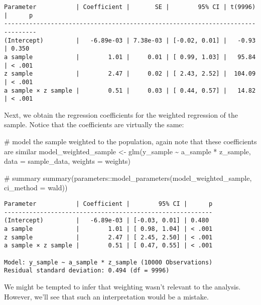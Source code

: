 \documentclass[
  single column]{article}
\newenvironment{Shaded}{\begin{snugshade}}{\end{snugshade}}
\newcommand{\AttributeTok}[1]{\textcolor[rgb]{0.40,0.45,0.13}{#1}}
\newcommand{\CommentTok}[1]{\textcolor[rgb]{0.37,0.37,0.37}{#1}}
\newcommand{\FunctionTok}[1]{\textcolor[rgb]{0.28,0.35,0.67}{#1}}
\newcommand{\NormalTok}[1]{\textcolor[rgb]{0.00,0.23,0.31}{#1}}
\newcommand{\OtherTok}[1]{\textcolor[rgb]{0.00,0.23,0.31}{#1}}
\newcommand{\SpecialCharTok}[1]{\textcolor[rgb]{0.37,0.37,0.37}{#1}}
\newcommand{\StringTok}[1]{\textcolor[rgb]{0.13,0.47,0.30}{#1}}
\begin{document}
\begin{verbatim}
Parameter           | Coefficient |       SE |        95% CI | t(9996) |      p
-------------------------------------------------------------------------------
(Intercept)         |   -6.89e-03 | 7.38e-03 | [-0.02, 0.01] |   -0.93 | 0.350 
a sample            |        1.01 |     0.01 | [ 0.99, 1.03] |   95.84 | < .001
z sample            |        2.47 |     0.02 | [ 2.43, 2.52] |  104.09 | < .001
a sample × z sample |        0.51 |     0.03 | [ 0.44, 0.57] |   14.82 | < .001
\end{verbatim}

Next, we obtain the regression coefficients for the weighted regression
of the sample. Notice that the coefficients are virtually the same:

\begin{Shaded}
\begin{Highlighting}[]
\CommentTok{\# model the sample weighted to the population, again note that these coefficients are similar }
\NormalTok{model\_weighted\_sample }\OtherTok{\textless{}{-}} \FunctionTok{glm}\NormalTok{(y\_sample }\SpecialCharTok{\textasciitilde{}}\NormalTok{ a\_sample }\SpecialCharTok{*}\NormalTok{ z\_sample, }
  \AttributeTok{data =}\NormalTok{ sample\_data, }\AttributeTok{weights =}\NormalTok{ weights)}

\CommentTok{\# summary}
\FunctionTok{summary}\NormalTok{(parameters}\SpecialCharTok{::}\FunctionTok{model\_parameters}\NormalTok{(model\_weighted\_sample, }
  \AttributeTok{ci\_method =} \StringTok{\textquotesingle{}wald\textquotesingle{}}\NormalTok{))}
\end{Highlighting}
\end{Shaded}

\begin{verbatim}
Parameter           | Coefficient |        95% CI |      p
----------------------------------------------------------
(Intercept)         |   -6.89e-03 | [-0.03, 0.01] | 0.480 
a sample            |        1.01 | [ 0.98, 1.04] | < .001
z sample            |        2.47 | [ 2.45, 2.50] | < .001
a sample × z sample |        0.51 | [ 0.47, 0.55] | < .001

Model: y_sample ~ a_sample * z_sample (10000 Observations)
Residual standard deviation: 0.494 (df = 9996)
\end{verbatim}

We might be tempted to infer that weighting wasn't relevant to the
analysis. However, we'll see that such an interpretation would be a
mistake.
\end{document}
